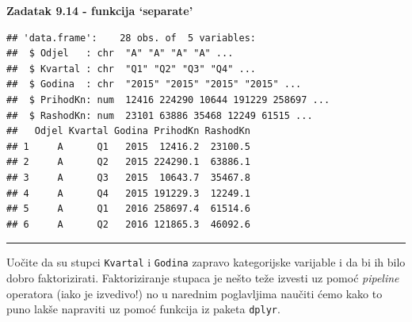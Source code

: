 \documentclass[]{book}
\newenvironment{Shaded}{\begin{snugshade}}{\end{snugshade}}
\newcommand{\KeywordTok}[1]{\textcolor[rgb]{0.13,0.29,0.53}{\textbf{#1}}}
\newcommand{\StringTok}[1]{\textcolor[rgb]{0.31,0.60,0.02}{#1}}
\newcommand{\CommentTok}[1]{\textcolor[rgb]{0.56,0.35,0.01}{\textit{#1}}}
\newcommand{\OperatorTok}[1]{\textcolor[rgb]{0.81,0.36,0.00}{\textbf{#1}}}
\newcommand{\NormalTok}[1]{#1}
\theoremstyle{definition}
\theoremstyle{definition}
\theoremstyle{definition}
\theoremstyle{remark}
\begin{document}
\textbf{Zadatak 9.14 - funkcija `separate'}

\begin{Shaded}
\end{Shaded}

\begin{Shaded}
\end{Shaded}

\begin{verbatim}
## 'data.frame':    28 obs. of  5 variables:
##  $ Odjel   : chr  "A" "A" "A" "A" ...
##  $ Kvartal : chr  "Q1" "Q2" "Q3" "Q4" ...
##  $ Godina  : chr  "2015" "2015" "2015" "2015" ...
##  $ PrihodKn: num  12416 224290 10644 191229 258697 ...
##  $ RashodKn: num  23101 63886 35468 12249 61515 ...
##   Odjel Kvartal Godina PrihodKn RashodKn
## 1     A      Q1   2015  12416.2  23100.5
## 2     A      Q2   2015 224290.1  63886.1
## 3     A      Q3   2015  10643.7  35467.8
## 4     A      Q4   2015 191229.3  12249.1
## 5     A      Q1   2016 258697.4  61514.6
## 6     A      Q2   2016 121865.3  46092.6
\end{verbatim}

\begin{center}\rule{0.5\linewidth}{\linethickness}\end{center}

Uočite da su stupci \texttt{Kvartal} i \texttt{Godina} zapravo
kategorijske varijable i da bi ih bilo dobro faktorizirati.
Faktoriziranje stupaca je nešto teže izvesti uz pomoć \emph{pipeline}
operatora (iako je izvedivo!) no u narednim poglavljima naučiti ćemo
kako to puno lakše napraviti uz pomoć funkcija iz paketa \texttt{dplyr}.
\end{document}
